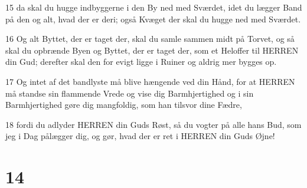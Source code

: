 \par 15 da skal du hugge indbyggerne i den By ned med Sværdet, idet du lægger Band på den og alt, hvad der er deri; også Kvæget der skal du hugge ned med Sværdet.
\par 16 Og alt Byttet, der er taget der, skal du samle sammen midt på Torvet, og så skal du opbrænde Byen og Byttet, der er taget der, som et Heloffer til HERREN din Gud; derefter skal den for evigt ligge i Ruiner og aldrig mer bygges op.
\par 17 Og intet af det bandlyste må blive hængende ved din Hånd, for at HERREN må standse sin flammende Vrede og vise dig Barmhjertighed og i sin Barmhjertighed gøre dig mangfoldig, som han tilsvor dine Fædre,
\par 18 fordi du adlyder HERREN din Guds Røst, så du vogter på alle hans Bud, som jeg i Dag pålægger dig, og gør, hvad der er ret i HERREN din Guds Øjne!

\chapter{14}

